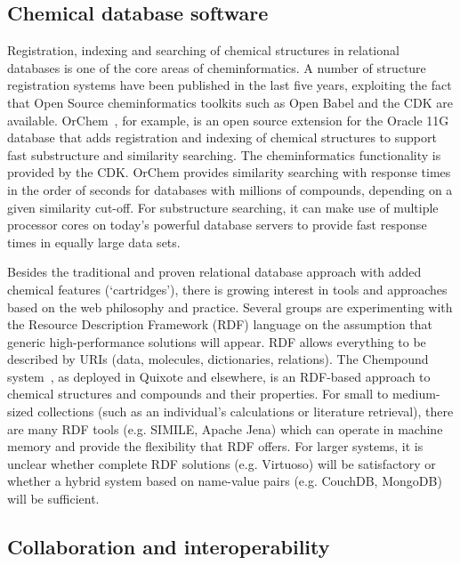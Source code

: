 \documentclass[10pt]{bmc_article}
\newenvironment{bmcformat}{\fussy\setboolean{publ}{true}}{\fussy}
\begin{document}
\begin{bmcformat}
\subsection*{Chemical database software}

Registration, indexing and searching of chemical structures in
relational databases is one of the core areas of cheminformatics.
A number of structure registration systems have been published in the last five years, exploiting the fact that
Open Source cheminformatics toolkits such as Open Babel and the CDK
are available.
OrChem~\cite{RijnbeekS10}, for example, is an open source extension for the Oracle 11G database that
adds registration and indexing of chemical structures to support fast
substructure and similarity searching. The cheminformatics
functionality is provided by the CDK. OrChem
provides similarity searching with response times in the order of
seconds for databases with millions of compounds, depending on a given
similarity cut-off. For substructure searching, it can make use of
multiple processor cores on today's powerful database servers to
provide fast response times in equally large data sets.

Besides the traditional and proven relational database approach with
added chemical features (`cartridges'), there is growing
interest in tools and approaches based on the web philosophy and
practice. Several groups are experimenting with 
the Resource Description Framework (RDF) language
on the assumption that generic high-performance solutions will appear.
RDF allows everything to be described by
URIs (data, molecules, dictionaries, relations). The Chempound
system~\cite{Chempound},
as deployed in
Quixote and elsewhere, is an RDF-based approach to chemical structures
and compounds and their properties. For small
to medium-sized collections (such as an individual's calculations or
literature retrieval), there are many RDF tools
(e.g. SIMILE, Apache Jena) which can operate in machine memory and provide
the flexibility that RDF offers. For larger
systems, it is unclear whether complete RDF solutions (e.g. Virtuoso)
will be satisfactory or whether a hybrid system
based on name-value pairs (e.g. CouchDB, MongoDB) will be sufficient.

  \subsection*{Collaboration and interoperability}


\end{bmcformat}
\end{document}
